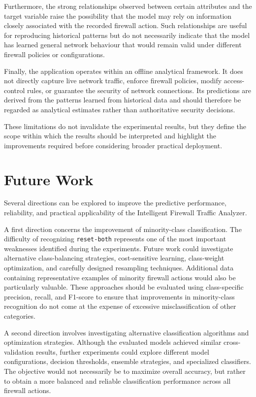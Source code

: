 Furthermore, the strong relationships observed between certain attributes and the target variable raise the possibility that the model may rely on information closely associated with the recorded firewall action. Such relationships are useful for reproducing historical patterns but do not necessarily indicate that the model has learned general network behaviour that would remain valid under different firewall policies or configurations.

Finally, the application operates within an offline analytical framework. It does not directly capture live network traffic, enforce firewall policies, modify access-control rules, or guarantee the security of network connections. Its predictions are derived from the patterns learned from historical data and should therefore be regarded as analytical estimates rather than authoritative security decisions.

These limitations do not invalidate the experimental results, but they define the scope within which the results should be interpreted and highlight the improvements required before considering broader practical deployment.










\section*{Future Work}
 Several directions can be explored to improve the predictive performance, reliability, and practical applicability of the Intelligent Firewall Traffic Analyzer.

A first direction concerns the improvement of minority-class classification. The difficulty of recognizing \texttt{reset-both} represents one of the most important weaknesses identified during the experiments. Future work could investigate alternative class-balancing strategies, cost-sensitive learning, class-weight optimization, and carefully designed resampling techniques. Additional data containing representative examples of minority firewall actions would also be particularly valuable. These approaches should be evaluated using class-specific precision, recall, and F1-score to ensure that improvements in minority-class recognition do not come at the expense of excessive misclassification of other categories.

A second direction involves investigating alternative classification algorithms and optimization strategies. Although the evaluated models achieved similar cross-validation results, further experiments could explore different model configurations, decision thresholds, ensemble strategies, and specialized classifiers. The objective would not necessarily be to maximize overall accuracy, but rather to obtain a more balanced and reliable classification performance across all firewall actions.

